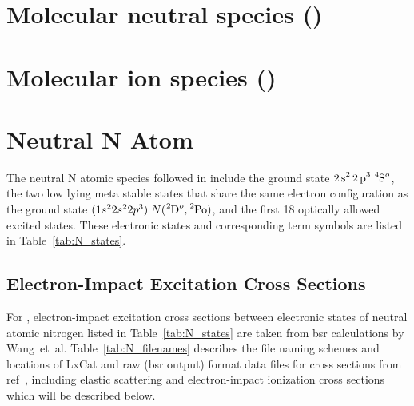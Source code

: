 \section{Molecular neutral species ()}
\tbd



\section{Molecular ion species ()}
\tbd


\section{Neutral N Atom}

The neutral N atomic species followed in \bpcmn{} include
the ground state $\ce{2s^2 2p^3}\;\ce{^4S^o}$, the two low lying meta stable states
that share the same electron configuration as the ground state
$(1s^22s^22p^3)\; N(\ce{^2D^o}, \ce{^2Po})$, and the first 18 optically allowed 
excited states.  These electronic states and corresponding term symbols
are listed in Table~\ref{tab:N_states}. 

\subsection{Electron-Impact Excitation Cross Sections}

For \bpcmn{}, electron-impact excitation
cross sections between electronic 
states of neutral
atomic nitrogen listed in Table~\ref{tab:N_states} are taken from \ac{bsr}
calculations by Wang~et~al.\cite{wang2014} 
Table~\ref{tab:N_filenames} describes the file naming schemes and locations of LxCat and raw (\ac{bsr} output)
format data files for cross sections from ref~\cite{wang2014}, including elastic scattering and electron-impact 
ionization cross sections which will be described below. \\

